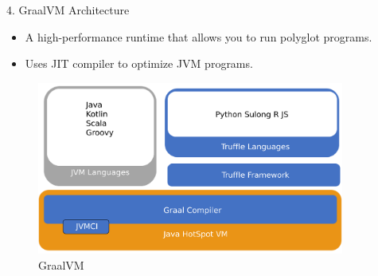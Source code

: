 \begin{roundedbeamerblock}{4. GraalVM Architecture}

    \vspace{5mm}
    \begin{itemize}
        \item A high-performance runtime that allows you to run polyglot programs.
        \vspace{5mm}
        \item Uses JIT compiler to optimize JVM programs.
    \end{itemize}
    \begin{figure}[h]
        \centering
        \includegraphics[width=0.9\textwidth]{images/graalvmArchitecture}
        \caption{GraalVM}
        \label{fig:graalvmArchitecture}
    \end{figure}

\end{roundedbeamerblock}
